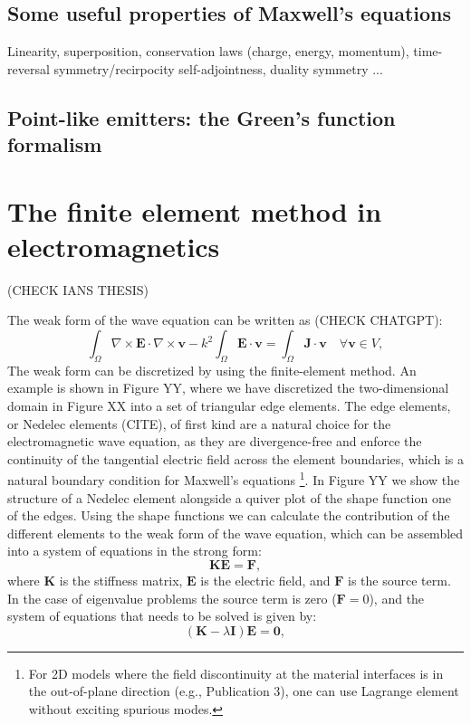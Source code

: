 \subsection*{Some useful properties of Maxwell's equations}

Linearity, superposition, conservation laws (charge, energy, momentum), time-reversal symmetry/recirpocity
self-adjointness, duality symmetry ...

\subsection*{Point-like emitters: the Green's function formalism}

\section{The finite element method in electromagnetics}

(CHECK IANS THESIS)

The weak form of the wave equation can be written as (CHECK CHATGPT):
\begin{equation}
    \int_{\Omega} \nabla \times \mathbf{E} \cdot \nabla \times \mathbf{v} - k^2 \int_{\Omega} \mathbf{E} \cdot \mathbf{v} = \int_{\Omega} \mathbf{J} \cdot \mathbf{v} \quad \forall \mathbf{v} \in V,
\end{equation}
The weak form can be discretized by using the finite-element method. An example is shown in Figure YY, 
where we have discretized the two-dimensional domain in Figure XX into a set of triangular edge elements. 
The edge elements, or Nedelec elements (CITE), of first kind are a natural choice for the electromagnetic 
wave equation, as they are divergence-free and enforce the continuity of the tangential electric field 
across the element boundaries, which is a natural boundary condition for Maxwell's equations 
\footnote{For 2D models where the field discontinuity at the material interfaces 
is in the out-of-plane direction (e.g., Publication 3), one can use Lagrange element without 
exciting spurious modes.}. In Figure YY
we show the structure of a Nedelec element alongside a quiver plot of the shape function one of the edges.
Using the shape functions we can calculate the contribution of the different elements to the weak form of the
wave equation, which can be assembled into a system of equations in the strong form:
\begin{equation}
    \mathbf{K} \mathbf{E} = \mathbf{F},
\end{equation}
where $\mathbf{K}$ is the stiffness matrix, $\mathbf{E}$ is the electric field, and $\mathbf{F}$ is the source
 term. In the case of eigenvalue problems the source term is zero ($\mathbf{F}=0$), and the system of equations 
that needs to be solved is given by:
\begin{equation}
    \left(\mathbf{K} - \lambda \mathbf{I} \right) \mathbf{E} =  \mathbf{0},
\end{equation}

